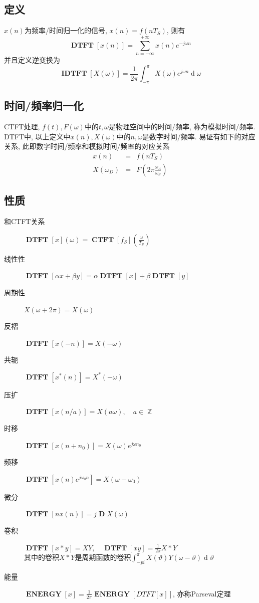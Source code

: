 \documentclass{ctexart}
\DeclareMathOperator{\CTFT}{\mathbf{CTFT}}
\DeclareMathOperator{\DTFT}{\mathbf{DTFT}}
\DeclareMathOperator{\IDTFT}{\mathbf{IDTFT}}
\DeclareMathOperator{\ENERGY}{\mathbf{ENERGY}}
\DeclareMathOperator{\D}{\mathbf{D}}
\DeclareMathOperator{\ud}{\mathrm{d}}
\DeclareMathOperator{\Zset}{\mathbb{Z}}
\begin{document}
\subsection{定义} $x(n)$为频率/时间归一化的信号, $x(n) = f(nT_S)$, 则有\[
    \DTFT[x(n)] = \sum_{n = -\infty}^{+\infty} x(n) e^{-j \omega n} \]
    并且定义逆变换为 \[
    \IDTFT[X(\omega)] = \frac{1}{2\pi} \int_{-\pi}^{\pi} X(\omega) e^{j \omega n} \ud \omega\]

\subsection{时间/频率归一化}
    CTFT处理, $f(t), F(\omega)$中的$t, \omega$是物理空间中的时间/频率, 称为模拟时间/频率.
    DTFT中, 以上定义中$x(n), X(\omega)$中的$n, \omega$是数字时间/频率.
    易证有如下的对应关系, 此即数字时间/频率和模拟时间/频率的对应关系
    \begin{eqnarray*}
        x(n) &=& f(nT_S)\\
        X(\omega_D) &=& F(2\pi \frac{\omega_A}{\omega_S})
    \end{eqnarray*}

\subsection{性质}
    \begin{description}
        \item[和CTFT关系] $\displaystyle \DTFT[x](\omega) = \CTFT[f_S](\frac{\omega}{T_S})$
        \item[线性性] $\displaystyle \DTFT[\alpha x + \beta y] = \alpha \DTFT[x] + \beta \DTFT[y]$
        \item[周期性] $\displaystyle X(\omega + 2\pi) = X(\omega)$
        \item[反褶] $\displaystyle \DTFT[x(-n)] = X(-\omega)$
        \item[共轭] $\displaystyle \DTFT[x^*(n)] = X^*(-\omega)$
        \item[压扩] $\displaystyle \DTFT[x(n/a)] = X(a\omega), \quad a \in \Zset$
        \item[时移] $\displaystyle \DTFT[x(n + n_0)] = X(\omega) e^{j \omega n_0}$
        \item[频移] $\displaystyle \DTFT[x(n) e^{j \omega_0 n}] = X(\omega - \omega_0)$
        \item[微分] $\displaystyle \DTFT[nx(n)] = j \D X(\omega)$
        \item[卷积] $\displaystyle \DTFT[x * y] = X Y,\quad \DTFT[x y] = \frac{1}{2\pi} X * Y$\\
            其中的卷积$X * Y$是周期函数的卷积$\int_{-pi}^{\pi} X(\vartheta) Y(\omega - \vartheta) \ud \vartheta$
        \item[能量] $\displaystyle \ENERGY[x] = \frac{1}{2\pi} \ENERGY[DTFT[x]]$, 亦称Parseval定理
    \end{description}
\end{document}
